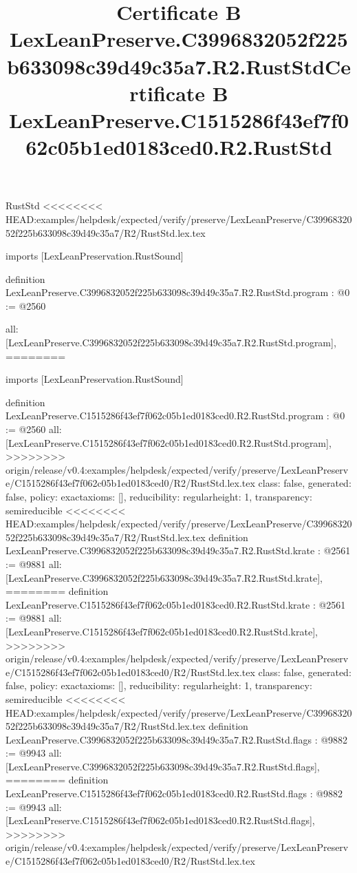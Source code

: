 \begin{lexlean}{RustStd}
<<<<<<<< HEAD:examples/helpdesk/expected/verify/preserve/LexLeanPreserve/C3996832052f225b633098c39d49c35a7/R2/RustStd.lex.tex
\title{Certificate B LexLeanPreserve.C3996832052f225b633098c39d49c35a7.R2.RustStd}
\begin{coremodule}
imports [LexLeanPreservation.RustSound]

definition LexLeanPreserve.C3996832052f225b633098c39d49c35a7.R2.RustStd.program : @0 := @2560 {
  all: [LexLeanPreserve.C3996832052f225b633098c39d49c35a7.R2.RustStd.program],
========
\title{Certificate B LexLeanPreserve.C1515286f43ef7f062c05b1ed0183ced0.R2.RustStd}
\begin{coremodule}
imports [LexLeanPreservation.RustSound]

definition LexLeanPreserve.C1515286f43ef7f062c05b1ed0183ced0.R2.RustStd.program : @0 := @2560 {
  all: [LexLeanPreserve.C1515286f43ef7f062c05b1ed0183ced0.R2.RustStd.program],
>>>>>>>> origin/release/v0.4:examples/helpdesk/expected/verify/preserve/LexLeanPreserve/C1515286f43ef7f062c05b1ed0183ced0/R2/RustStd.lex.tex
  class: false,
  generated: false,
  policy: exact{axioms: []},
  reducibility: regular{height: 1},
  transparency: semireducible
}
<<<<<<<< HEAD:examples/helpdesk/expected/verify/preserve/LexLeanPreserve/C3996832052f225b633098c39d49c35a7/R2/RustStd.lex.tex
definition LexLeanPreserve.C3996832052f225b633098c39d49c35a7.R2.RustStd.krate : @2561 := @9881 {
  all: [LexLeanPreserve.C3996832052f225b633098c39d49c35a7.R2.RustStd.krate],
========
definition LexLeanPreserve.C1515286f43ef7f062c05b1ed0183ced0.R2.RustStd.krate : @2561 := @9881 {
  all: [LexLeanPreserve.C1515286f43ef7f062c05b1ed0183ced0.R2.RustStd.krate],
>>>>>>>> origin/release/v0.4:examples/helpdesk/expected/verify/preserve/LexLeanPreserve/C1515286f43ef7f062c05b1ed0183ced0/R2/RustStd.lex.tex
  class: false,
  generated: false,
  policy: exact{axioms: []},
  reducibility: regular{height: 1},
  transparency: semireducible
}
<<<<<<<< HEAD:examples/helpdesk/expected/verify/preserve/LexLeanPreserve/C3996832052f225b633098c39d49c35a7/R2/RustStd.lex.tex
definition LexLeanPreserve.C3996832052f225b633098c39d49c35a7.R2.RustStd.flags : @9882 := @9943 {
  all: [LexLeanPreserve.C3996832052f225b633098c39d49c35a7.R2.RustStd.flags],
========
definition LexLeanPreserve.C1515286f43ef7f062c05b1ed0183ced0.R2.RustStd.flags : @9882 := @9943 {
  all: [LexLeanPreserve.C1515286f43ef7f062c05b1ed0183ced0.R2.RustStd.flags],
>>>>>>>> origin/release/v0.4:examples/helpdesk/expected/verify/preserve/LexLeanPreserve/C1515286f43ef7f062c05b1ed0183ced0/R2/RustStd.lex.tex
}}}
\end{coremodule}}
\end{coremodule}
\end{lexlean}
